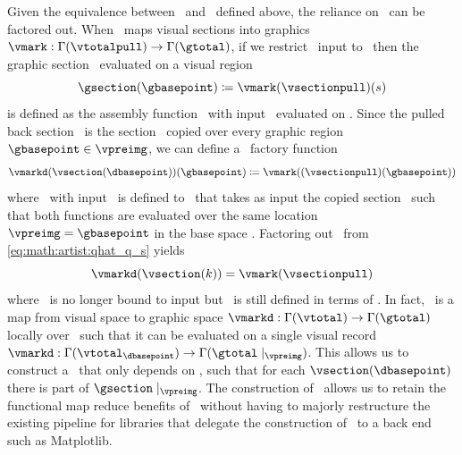 \documentclass[../main.tex]{subfiles}
\begin{document}
Given the equivalence between \vsection\ and \vsectionpull\ defined above, the reliance on \gbase\ can be factored out. When \vmark\ maps visual sections into graphics $\vmark: \Gamma(\vtotalpull) \rightarrow \Gamma(\gtotal)$, if we restrict \vmark\ input to \vsectionpull\ then the graphic section \gsection\ evaluated on a visual region \gbasepoint\
\begin{equation}
    \gsection(\gbasepoint) \coloneqq \vmark(\vsectionpull)(s)
    \label{eq:math:artist:qhat}
\end{equation}
 is defined as the assembly function \vmark\ with input \vsectionpull\ evaluated on \gbasepoint. Since the pulled back section \vsectionpull\ is the section \vsection\ copied over every graphic region $\gbasepoint \in \vpreimg$, we can define a \vmark\ factory function 
\begin{equation}
\label{eq:math:artist:qhat_q_s}
\vmarkd(\vsection(\dbasepoint))(\gbasepoint) \coloneqq \vmark((\vsectionpull)(\gbasepoint))
\end{equation} 
where \vmarkd\ with input \vsection\ is defined to \vmark\ that takes as input the copied section \vsectionpull\ such that both functions are evaluated over the same location $\vpreimg = \gbasepoint$ in the base space \gbase. Factoring out \gbasepoint\ from \autoref{eq:math:artist:qhat_q_s} yields
\begin{equation}
\vmarkd(\vsection(k)) = \vmark(\vsectionpull)
\label{eq:math:artist:qhat_k}
\end{equation}
where \vmark\ is no longer bound to input but \vmarkd\ is still defined in terms of \dbase. In fact, \vmarkd\ is a map from visual space to graphic space $\vmarkd:\Gamma(\vtotal) \rightarrow \Gamma(\gtotal)$ locally over \dbasepoint\ such that it can be evaluated on a single visual record  $\vmarkd:\Gamma(\vtotal_{\dbasepoint}) \rightarrow \Gamma(\gtotal\mid_{\vpreimg})$. This allows us to construct a \vmarkd\ that only depends on \dbase, such that for each $\vsection(\dbasepoint)$ there is part of $\gsection\mid_{\vpreimg}$. The construction of \vmarkd\ allows us to retain the functional map reduce benefits of \vmark\ without having to majorly restructure the existing pipeline for libraries that delegate the construction of \gsection\ to a back end such as Matplotlib.
\end{document}
